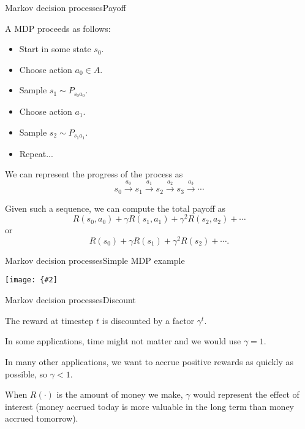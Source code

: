 \documentclass{beamer}
\newcommand{\myfig}[3]{\centerline{\texttt{[image: \{\#2]}}}
    \centerline{\scriptsize #3}}
\begin{document}
\begin{frame}{Markov decision processes}{Payoff}

  A MDP proceeds as follows:
  \begin{itemize}
  \item Start in some state $s_0$.
  \item Choose action $a_0 \in A$.
  \item Sample $s_1 \sim P_{s_0a_0}$.
  \item Choose action $a_1$.
  \item Sample $s_2 \sim P_{s_1a_1}$.
  \item Repeat...
  \end{itemize}

  \medskip

  We can represent the progress of the process as
  \[ s_0 \stackrel{a_0}{\rightarrow} s_1 \stackrel{a_1}{\rightarrow}
     s_2 \stackrel{a_2}{\rightarrow} s_3 \stackrel{a_3}{\rightarrow} \cdots
  \]

  Given such a sequence, we can compute the \alert{total payoff} as
  \[ R(s_0,a_0) + \gamma R(s_1,a_1) + \gamma^2 R(s_2,a_2) + \cdots \]
  or
  \[ R(s_0) + \gamma R(s_1) + \gamma^2 R(s_2) + \cdots .\]
  
\end{frame}


\begin{frame}{Markov decision processes}{Simple MDP example}

\myfig{3in}{mdp}{\url{https://en.wikipedia.org/wiki/Markov_decision_process}}

\end{frame}


\begin{frame}{Markov decision processes}{Discount}

  The reward at timestep $t$ is \alert{discounted} by a factor $\gamma^t$.

  \medskip

  In some applications, time might not matter and we would use $\gamma=1$.

  \medskip

  In many other applications, we want to accrue positive rewards as quickly
  as possible, so $\gamma < 1$.

  \medskip

  When $R(\cdot)$ is the amount of money we make, $\gamma$ would
  represent the effect of interest (money accrued today is more
  valuable in the long term than money accrued tomorrow).

\end{frame}
\end{document}
